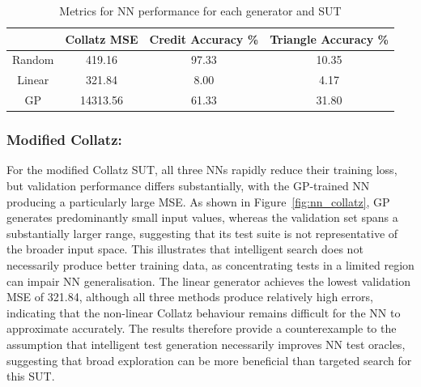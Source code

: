 \documentclass[runningheads]{llncs}
\begin{document}
\begin{table}[!htb]
\centering
	\caption{Metrics for NN performance for each generator and SUT}
	\label{tab:nn_perf}
	\begin{tabular}{|c|c|c|c|}
		\hline
		& Collatz MSE & Credit Accuracy \% & Triangle Accuracy \%   \\
		\hline
		Random & 419.16      & 97.33              & 10.35                  \\
		Linear & 321.84      & 8.00               & 4.17                   \\
		GP     & 14313.56    & 61.33              & 31.80                  \\
		\hline
	\end{tabular}
\end{table}

\subsubsection{Modified Collatz:}

For the modified Collatz SUT, all three NNs rapidly reduce their training loss, but validation performance differs substantially, with the GP-trained NN producing a particularly large MSE. As shown in Figure~\ref{fig:nn_collatz}, GP generates predominantly small input values, whereas the validation set spans a substantially larger range, suggesting that its test suite is not representative of the broader input space. This illustrates that intelligent search does not necessarily produce better training data, as concentrating tests in a limited region can impair NN generalisation. The linear generator achieves the lowest validation MSE of 321.84, although all three methods produce relatively high errors, indicating that the non-linear Collatz behaviour remains difficult for the NN to approximate accurately. The results therefore provide a counterexample to the assumption that intelligent test generation necessarily improves NN test oracles, suggesting that broad exploration can be more beneficial than targeted search for this SUT.
\end{document}
